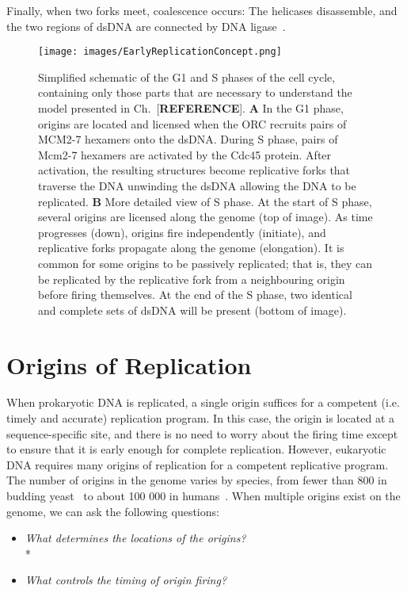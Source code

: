 		Finally, when two forks meet, coalescence occurs:
		The helicases disassemble, and the two regions of dsDNA are connected by DNA ligase~\cite{MolecularCellBiology}.
	
	\begin{figure}[tbh]
		\begin{center}
			\texttt{[image: images/EarlyReplicationConcept.png]}
		\end{center}
			\caption[Events During Replication]{\label{fig:EarlyReplicationConcept} Simplified schematic of the G1 and S phases of the cell cycle, containing only those parts that are necessary to understand the model presented in Ch.~[\textbf{REFERENCE}].
				\textbf{A} In the G1 phase, origins are located and licensed when the ORC recruits pairs of MCM2-7 hexamers onto the dsDNA.
					During S phase, pairs of Mcm2-7 hexamers are activated by the Cdc45 protein.
					After activation, the resulting structures become replicative forks that traverse the DNA unwinding the dsDNA allowing the DNA to be replicated.
				\textbf{B} More detailed view of S phase.
					At the start of S phase, several origins are licensed along the genome (top of image).
					As time progresses (down), origins fire independently (initiate), and replicative forks propagate along the genome (elongation).
					It is common for some origins to be passively replicated; that is, they can be replicated by the replicative fork from a neighbouring origin before firing themselves.
					At the end of the S phase, two identical and complete sets of dsDNA will be present (bottom of image).}
	\end{figure}
	
	
	\section{Origins of Replication}
	\label{sec:Origins}
	
	When prokaryotic DNA is replicated, a single origin suffices for a competent (i.e. timely and accurate) replication program.
	In this case, the origin is located at a sequence-specific site, and there is no need to worry about the firing time except to ensure that it is early enough for complete replication.
	However, eukaryotic DNA requires many origins of replication for a competent replicative program.
	The number of origins in the genome varies by species, from fewer than 800 in budding yeast~\cite{OriDB} to about 100 000 in humans~\cite{OriginsReview}.
	When multiple origins exist on the genome, we can ask the following questions:
	\begin{itemize}
		\item \emph{What determines the locations of the origins?}\\*
		\item \emph{What controls the timing of origin firing?}
	\end{itemize}
	
